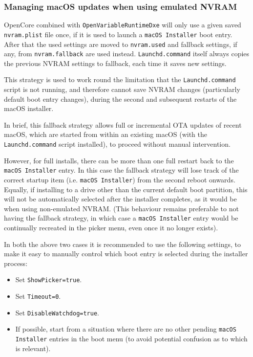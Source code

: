 \documentclass[]{article}
\providecommand{\tightlist}{%
  \setlength{\itemsep}{0pt}\setlength{\parskip}{0pt}}
\begin{document}
\subsubsection{Managing macOS updates when using emulated NVRAM}

OpenCore combined with \texttt{OpenVariableRuntimeDxe} will only use a given saved \texttt{nvram.plist} file once,
if it is used to launch a \texttt{macOS Installer} boot entry. After that the used settings are moved to \texttt{nvram.used}
and fallback settings, if any, from \texttt{nvram.fallback} are used instead. \texttt{Launchd.command} itself
always copies the previous NVRAM settings to fallback, each time it saves new settings.

This strategy is used to work round the limitation that the \texttt{Launchd.command} script is not running,
and therefore cannot save NVRAM changes (particularly default boot entry changes), during the second
and subsequent restarts of the macOS installer.

In brief, this fallback strategy allows full or incremental OTA updates of recent macOS, which are started from within
an existing macOS (with the \texttt{Launchd.command} script installed), to proceed without manual intervention.

However, for full installs, there can be more than one full restart back to the \texttt{macOS Installer} entry. In this case
the fallback strategy will lose track of the correct startup item (i.e. \texttt{macOS Installer}) from the second reboot
onwards. Equally, if installing to a drive other than the current default boot partition, this will not be automatically selected after
the installer completes, as it would be when using non-emulated NVRAM. (This behaviour remains preferable to not having the fallback strategy,
in which case a \texttt{macOS Installer} entry would be continually recreated in the picker menu, even once it no longer exists).

In both the above two cases it is recommended to use the following settings, to make it easy to manually control which boot
entry is selected during the installer process:

\begin{itemize}
\tightlist
 \item Set \texttt{ShowPicker=true}.
 \item Set \texttt{Timeout=0}.
 \item Set \texttt{DisableWatchdog=true}.
 \item If possible, start from a situation where there are no other pending \texttt{macOS Installer} entries in the boot menu
 (to avoid potential confusion as to which is relevant).
\end{itemize}
\end{document}
